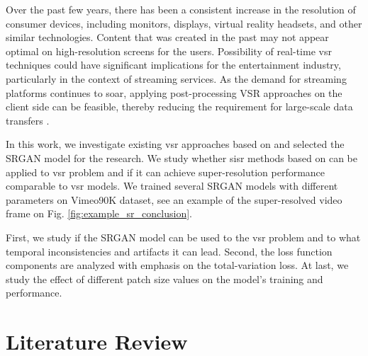 \documentclass[conference]{IEEEtran}
\begin{document}
Over the past few years, there has been a consistent increase in the resolution of consumer devices, including monitors, displays, virtual reality headsets, and other similar technologies. Content that was created in the past may not appear optimal on high-resolution screens for the users. Possibility of real-time \acrshort{vsr} techniques could have significant implications for the entertainment industry, particularly in the context of streaming services. As the demand for streaming platforms continues to soar, applying post-processing VSR approaches on the client side can be feasible, thereby reducing the requirement for large-scale data transfers \cite{video_super_resolution_survey_2020}.

In this work, we investigate existing \acrshort{vsr} approaches based on  and selected the SRGAN \cite{srgan_2016} model for the research. We study whether \acrlong{sisr} methods based on  can be applied to \acrlong{vsr} problem and if it can achieve super-resolution performance comparable to \acrshort{vsr} models. We trained several SRGAN models with different parameters on Vimeo90K dataset, see an example of the super-resolved video frame on Fig. \ref{fig:example_sr_conclusion}.

First, we study if the SRGAN model can be used to the \acrshort{vsr} problem and to what temporal inconsistencies and artifacts it can lead. Second, the loss function components are analyzed with emphasis on the total-variation loss. At last, we study the effect of different patch size values on the model's training and performance.






\section{Literature Review}
\end{document}
